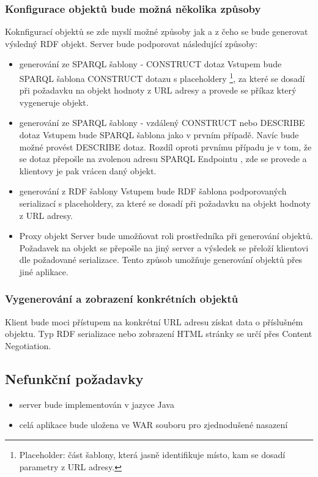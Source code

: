 \documentclass[thesis=B,czech]{FITthesis}[2012/06/26]
\begin{document}
  \subsubsection{Konfigurace objektů bude možná několika způsoby}  
  \label{sec:object_types}
  Koknfigurací objektů se zde myslí možné způsoby jak a z čeho se bude generovat výsledný RDF objekt. Server bude podporovat
  následující způsoby:
  \begin{itemize}
    \item generování ze SPARQL šablony - CONSTRUCT dotaz \cite{sparql_bob}
      \subitem Vstupem bude SPARQL šablona CONSTRUCT dotazu s placeholdery \footnote{Placeholder: část šablony, která jasně identifikuje místo, 
      kam se dosadí parametry z URL adresy.}, za které se dosadí při požadavku na objekt hodnoty z URL adresy
      a provede se příkaz který vygeneruje objekt.
      
     \item generování ze SPARQL šablony - vzdálený CONSTRUCT nebo DESCRIBE dotaz \cite{sparql_bob}
      \subitem Vstupem bude SPARQL šablona jako v prvním případě. Navíc bude možné provést DESCRIBE dotaz. Rozdíl oproti prvnímu případu je v tom, že se 
      dotaz přepošle na zvolenou adresu SPARQL Endpointu \cite{sparql_bob}, zde se provede a klientovy je pak vrácen daný objekt.
      
    \item generování z RDF šablony
     \subitem Vstupem bude RDF šablona podporovaných serializací s placeholdery, za které se dosadí při požadavku na objekt hodnoty z URL adresy. 
     
     \item Proxy objekt
      \subitem Server bude umožňovat roli prostředníka při generování objektů. Požadavek na objekt se přepošle na jiný server a výsledek se přeloží
      klientovi dle požadované serializace. Tento způsob umožňuje generování objektů přes jiné aplikace.
 \end{itemize}
 
 
  
  \subsubsection{Vygenerování a zobrazení konkrétních objektů}  
  Klient bude moci přístupem na konkrétní URL adresu získat data o příslušném objektu. Typ RDF serializace nebo zobrazení HTML stránky se určí přes 
  Content Negotiation.

\subsection{Nefunkční požadavky}
\begin{itemize}
    \item server bude implementován v jazyce Java
    \item celá aplikace bude uložena ve WAR souboru pro zjednodušené nasazení
 \end{itemize}
 
\end{document}
